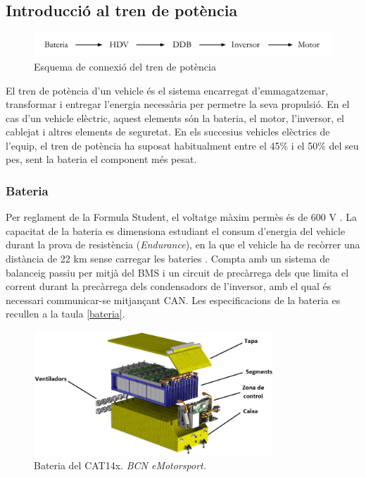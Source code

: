 \subsection{ Introducció al tren de potència }
{
    \begin{figure}[!htb]
        \centering
        \captionsetup{justification=centering, margin=1.5cm}
        \includegraphics[width=13cm]
            { img/2_formula_student/power.pdf }
        \caption{ Esquema de connexió del tren de potència }
    \end{figure}

    El tren de potència d'un vehicle és el sistema encarregat d'emmagatzemar,
    transformar i entregar l'energia necessària per permetre la seva propulsió.
    En el cas d'un vehicle elèctric, aquest elements són la bateria, el motor,
    l'inversor, el cablejat i altres elements de seguretat. En els succesius
    vehicles elèctrics de l'equip, el tren de potència ha suposat habitualment
    entre el 45\% i el 50\% del seu pes, sent la bateria el component més
    pesat.

    \subsubsection{ Bateria }
    {
        Per reglament de la Formula Student, el voltatge màxim permès és de 600
        V \cite{fs_rules}. La capacitat de la bateria es dimensiona estudiant
        el consum d'energia del vehicle durant la prova de resistència
        (\emph{Endurance}), en la que el vehicle ha de recòrrer una distància
        de 22 km sense carregar les bateries \cite{sergio}. Compta amb un
        sistema de balanceig passiu per mitjà del \ac{BMS} i un circuit de
        precàrrega dels que limita el corrent durant la precàrrega dels
        condensadors de l'inversor, amb el qual és necessari communicar-se
        mitjançant CAN. Les especificacions de la bateria es recullen a la
        taula \ref{bateria}.

        \begin{figure}[!htb]
            \centering
            \captionsetup{justification=centering, margin=1.5cm}
            \includegraphics[width=9cm]
                { img/2_formula_student/bateria.png }
            \caption{ Bateria del CAT14x. \emph{BCN eMotorsport.}}
        \end{figure}

}}
